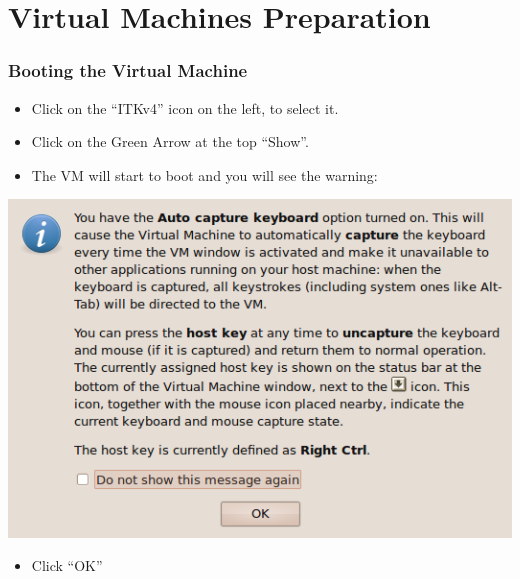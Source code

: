 \section{Virtual Machines Preparation}


\begin{frame}
\frametitle{Booting the Virtual Machine}
\begin{itemize}
\item Click on the ``ITKv4'' icon on the left, to select it.
\item Click on the Green Arrow at the top ``Show''.
\item The VM will start to boot and you will see the warning:
\end{itemize}
\begin{center}
  \includegraphics[width=0.4\paperwidth]{../Art/Screenshot-VirtualBox-OSE-02.png}
\end{center}
\begin{itemize}
\item Click ``OK''
\end{itemize}
\end{frame}

